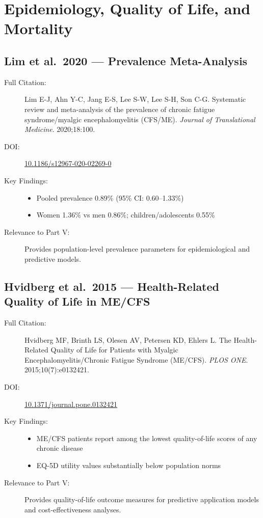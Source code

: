 \section{Epidemiology, Quality of Life, and Mortality}
\label{sec:bib-epidemiology-qol}

\subsection{Lim et al.\ 2020 --- Prevalence Meta-Analysis}

\begin{description}
    \item[Full Citation:] Lim E-J, Ahn Y-C, Jang E-S, Lee S-W, Lee S-H, Son C-G. Systematic review and meta-analysis of the prevalence of chronic fatigue syndrome/myalgic encephalomyelitis (CFS/ME). \textit{Journal of Translational Medicine}. 2020;18:100. \cite{lim2020prevalence}
    \item[DOI:] \href{https://doi.org/10.1186/s12967-020-02269-0}{10.1186/s12967-020-02269-0}
    \item[Key Findings:]
    \begin{itemize}
        \item Pooled prevalence 0.89\% (95\% CI: 0.60--1.33\%)
        \item Women 1.36\% vs men 0.86\%; children/adolescents 0.55\%
    \end{itemize}
    \item[Relevance to Part V:] Provides population-level prevalence parameters for epidemiological and predictive models.
\end{description}

\subsection{Hvidberg et al.\ 2015 --- Health-Related Quality of Life in ME/CFS}

\begin{description}
    \item[Full Citation:] Hvidberg MF, Brinth LS, Olesen AV, Petersen KD, Ehlers L. The Health-Related Quality of Life for Patients with Myalgic Encephalomyelitis/Chronic Fatigue Syndrome (ME/CFS). \textit{PLOS ONE}. 2015;10(7):e0132421. \cite{hvidberg2015quality}
    \item[DOI:] \href{https://doi.org/10.1371/journal.pone.0132421}{10.1371/journal.pone.0132421}
    \item[Key Findings:]
    \begin{itemize}
        \item ME/CFS patients report among the lowest quality-of-life scores of any chronic disease
        \item EQ-5D utility values substantially below population norms
    \end{itemize}
    \item[Relevance to Part V:] Provides quality-of-life outcome measures for predictive application models and cost-effectiveness analyses.
\end{description}


